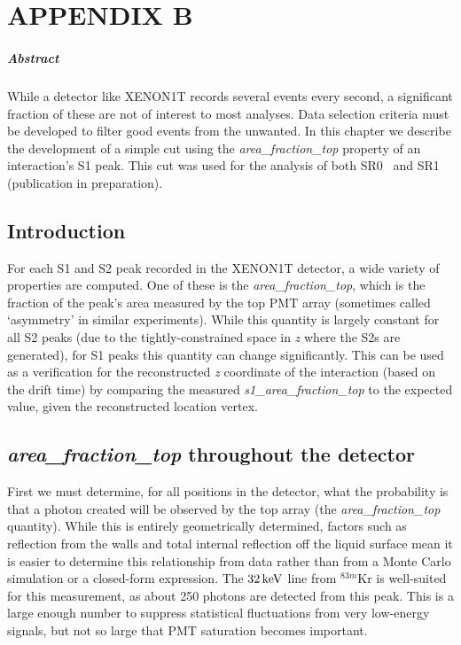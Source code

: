
\chapter{APPENDIX B}\label{app:s1aft} %

\paragraph{Abstract} While a detector like XENON1T records several events every second, a significant fraction of these are not of interest to most analyses. Data selection criteria must be developed to filter good events from the unwanted. In this chapter we describe the development of a simple cut using the \textit{area\_fraction\_top} property of an interaction's S1 peak. This cut was used for the analysis of both SR0~\cite{Aprile:2017iyp} and SR1 (publication in preparation).

\section{Introduction}

For each S1 and S2 peak recorded in the XENON1T detector, a wide variety of properties are computed. One of these is the \textit{area\_fraction\_top}, which is the fraction of the peak's area measured by the top PMT array (sometimes called `asymmetry' in similar experiments). While this quantity is largely constant for all S2 peaks (due to the tightly-constrained space in \textit{z} where the S2s are generated), for S1 peaks this quantity can change significantly. This can be used as a verification for the reconstructed \textit{z} coordinate of the interaction (based on the drift time) by comparing the measured \textit{s1\_area\_fraction\_top} to the expected value, given the reconstructed location vertex.

\section{\textit{area\_fraction\_top} throughout the detector}

First we must determine, for all positions in the detector, what the probability is that a photon created will be observed by the top array (the \textit{area\_fraction\_top} quantity). While this is entirely geometrically determined, factors such as reflection from the walls and total internal reflection off the liquid surface mean it is easier to determine this relationship from data rather than from a Monte Carlo simulation or a closed-form expression. The $32\,\mathrm{keV}$ line from $^{83m}$Kr is well-suited for this measurement, as about 250 photons are detected from this peak. This is a large enough number to suppress statistical fluctuations from very low-energy signals, but not so large that PMT saturation becomes important.

